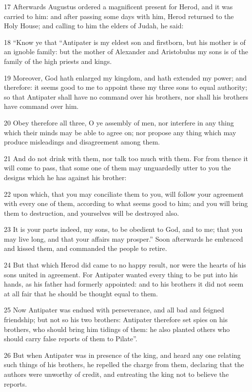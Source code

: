 17 Afterwards Augustus ordered a magnificent present for Herod, and it was carried to him: and after passing some days with him, Herod returned to the Holy House; and calling to him the elders of Judah, he said: 

18 “Know ye that “Antipater is my eldest son and firstborn, but his mother is of an ignoble family: but the mother of Alexander and Aristobulus my sons is of the family of the high priests and kings. 

19 Moreover, God hath enlarged my kingdom, and hath extended my power; and therefore: it seems good to me to appoint these my three sons to equal authority; so that Antipater shall have no command over his brothers, nor shall his brothers have command over him. 

20 Obey therefore all three, O ye assembly of men, nor interfere in any thing which their minds may be able to agree on; nor propose any thing which may produce misleadings and disagreement among them. 

21 And do not drink with them, nor talk too much with them. For from thence it will come to pass, that some one of them may unguardedly utter to you the designs which he has against his brother: 

22 upon which, that you may conciliate them to you, will follow your agreement with every one of them, according to what seems good to him; and you will bring them to destruction, and yourselves will be destroyed also. 

23 It is your parts indeed, my sons, to be obedient to God, and to me; that you may live long, and that your affairs may prosper.” Soon afterwards he embraced and kissed them, and commanded the people to retire. 

24 But that which Herod did came to no happy result, nor were the hearts of his sons united in agreement. For Antipater wanted every thing to be put into his hands, as his father had formerly appointed: and to his brothers it did not seem at all fair that he should be thought equal to them. 

25 Now Antipater was endued with perseverance, and all bad and feigned friendship; but not so his two brothers: Antipater therefore set spies on his brothers, who should bring him tidings of them: he also planted others who should carry false reports of them to Pilate”. 

26 But when Antipater was in presence of the king, and heard any one relating such things of his brothers, he repelled the charge from them, declaring that the authors were unworthy of credit, and entreating the king not to believe the reports. 

